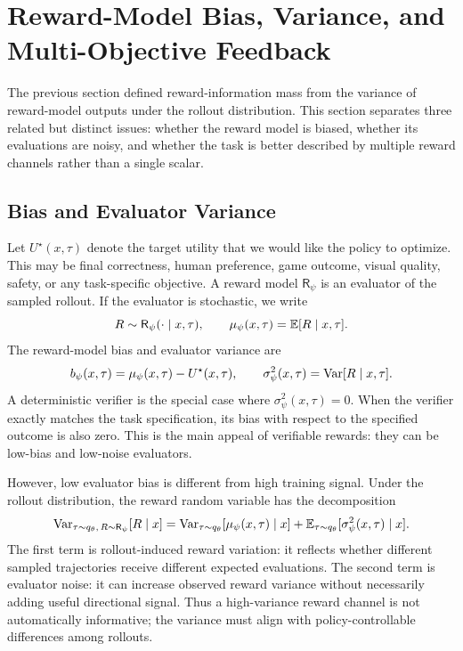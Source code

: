 \section{Reward-Model Bias, Variance, and Multi-Objective Feedback}

The previous section defined reward-information mass from the variance of reward-model outputs under the rollout distribution. This section separates three related but distinct issues: whether the reward model is biased, whether its evaluations are noisy, and whether the task is better described by multiple reward channels rather than a single scalar.

\subsection{Bias and Evaluator Variance}

Let $U^\star(x,\tau)$ denote the target utility that we would like the policy to optimize. This may be final correctness, human preference, game outcome, visual quality, safety, or any task-specific objective. A reward model $\mathsf{R}_\psi$ is an evaluator of the sampled rollout. If the evaluator is stochastic, we write
\[
  R \sim \mathsf{R}_\psi(\cdot\mid x,\tau),
  \qquad
  \mu_\psi(x,\tau)=\mathbb{E}[R\mid x,\tau].
\]
The reward-model bias and evaluator variance are
\[
  b_\psi(x,\tau)=\mu_\psi(x,\tau)-U^\star(x,\tau),
  \qquad
  \sigma_\psi^2(x,\tau)=\mathrm{Var}[R\mid x,\tau].
\]
A deterministic verifier is the special case where $\sigma_\psi^2(x,\tau)=0$. When the verifier exactly matches the task specification, its bias with respect to the specified outcome is also zero. This is the main appeal of verifiable rewards: they can be low-bias and low-noise evaluators.

However, low evaluator bias is different from high training signal. Under the rollout distribution, the reward random variable has the decomposition
\[
  \mathrm{Var}_{\tau\sim q_\theta,\,R\sim \mathsf{R}_\psi}
  [R\mid x]
  =
  \mathrm{Var}_{\tau\sim q_\theta}
  [\mu_\psi(x,\tau)\mid x]
  +
  \mathbb{E}_{\tau\sim q_\theta}
  [\sigma_\psi^2(x,\tau)\mid x].
\]
The first term is rollout-induced reward variation: it reflects whether different sampled trajectories receive different expected evaluations. The second term is evaluator noise: it can increase observed reward variance without necessarily adding useful directional signal. Thus a high-variance reward channel is not automatically informative; the variance must align with policy-controllable differences among rollouts.


